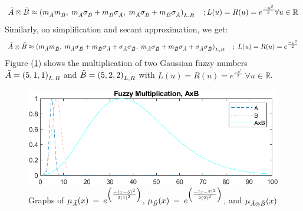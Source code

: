 \documentclass{article}
\begin{document}
\begin{equation}
\Tilde{A}\otimes\Tilde{B} \approx \left(m_{\Tilde{A}}m_{\Tilde{B}},\; m_{\Tilde{A}}\sigma_{\Tilde{B}}+m_{\Tilde{B}}\sigma_{\Tilde{A}},\; m_{\Tilde{A}}\sigma_{\Tilde{B}}+m_{\Tilde{B}}\sigma_{\Tilde{A}} \right)_{L,R}\quad;\;\newline L(u) = R(u) = e^{\frac{-u^2}{2}}   \forall u\in \mathbb{R}
\end{equation}\newline Similarly, on simplification and secant approximation, we get:
\begin{equation}
\Tilde{A}\otimes\Tilde{B} \approx \left(m_{\Tilde{A}}m_{\Tilde{B}},\; m_{\Tilde{A}}\sigma_{\Tilde{B}}+m_{\Tilde{B}}\sigma_{\Tilde{A}} + \sigma_{\Tilde{A}}\sigma_{\Tilde{B}},\; m_{\Tilde{A}}\sigma_{\Tilde{B}}+m_{\Tilde{B}}\sigma_{\Tilde{A}}+\sigma_{\Tilde{A}}\sigma_{\Tilde{B}} \right)_{L,R}\quad;\; L(u) = R(u) = e^{\frac{-u^2}{2}}   
\end{equation}\newline Figure (\ref{fig:prod_img}) shows the multiplication of two Gaussian fuzzy numbers $\Tilde{A} = \left(5,1,1\right)_{L,R}$ and $\Tilde{B} = \left(5,2,2\right)_{L,R}$ with $L(u) = R(u) = e^{\frac{-u^2}{2}} \; \forall u\in\mathbb{R}$.

\begin{figure}
    \centering
    \includegraphics[scale=1]{multiplication.png}
    \caption{\label{fig:prod_img} Graphs of $\mu_{\Tilde{A}}(x) \:=\:e^{\left( \frac{-(x-5)^2}{2(1)^{2}} \right)}$, $\mu_{\Tilde{B}}(x) \:=\:e^{\left( \frac{-(x-7)^2}{2(2)^{2}} \right)}$, and $\mu_{\Tilde{A}\otimes\Tilde{B}}(x)$}
    \label{fig:prod_img}
\end{figure}
\end{document}
